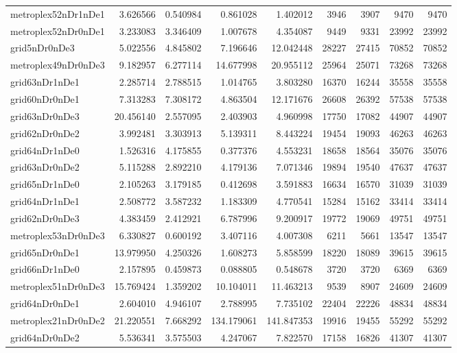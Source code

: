 \begin{longtable}{|l|r|r|r|r|r|r|r|r|}
metroplex52nDr1nDe1 & 3.626566 & 0.540984 & 0.861028 & 1.402012 & 3946 & 3907 & 9470 & 9470 \\
metroplex52nDr0nDe1 & 3.233083 & 3.346409 & 1.007678 & 4.354087 & 9449 & 9331 & 23992 & 23992 \\
grid5nDr0nDe3 & 5.022556 & 4.845802 & 7.196646 & 12.042448 & 28227 & 27415 & 70852 & 70852 \\
metroplex49nDr0nDe3 & 9.182957 & 6.277114 & 14.677998 & 20.955112 & 25964 & 25071 & 73268 & 73268 \\
grid63nDr1nDe1 & 2.285714 & 2.788515 & 1.014765 & 3.803280 & 16370 & 16244 & 35558 & 35558 \\
grid60nDr0nDe1 & 7.313283 & 7.308172 & 4.863504 & 12.171676 & 26608 & 26392 & 57538 & 57538 \\
grid63nDr0nDe3 & 20.456140 & 2.557095 & 2.403903 & 4.960998 & 17750 & 17082 & 44907 & 44907 \\
grid62nDr0nDe2 & 3.992481 & 3.303913 & 5.139311 & 8.443224 & 19454 & 19093 & 46263 & 46263 \\
grid64nDr1nDe0 & 1.526316 & 4.175855 & 0.377376 & 4.553231 & 18658 & 18564 & 35076 & 35076 \\
grid63nDr0nDe2 & 5.115288 & 2.892210 & 4.179136 & 7.071346 & 19894 & 19540 & 47637 & 47637 \\
grid65nDr1nDe0 & 2.105263 & 3.179185 & 0.412698 & 3.591883 & 16634 & 16570 & 31039 & 31039 \\
grid64nDr1nDe1 & 2.508772 & 3.587232 & 1.183309 & 4.770541 & 15284 & 15162 & 33414 & 33414 \\
grid62nDr0nDe3 & 4.383459 & 2.412921 & 6.787996 & 9.200917 & 19772 & 19069 & 49751 & 49751 \\
metroplex53nDr0nDe3 & 6.330827 & 0.600192 & 3.407116 & 4.007308 & 6211 & 5661 & 13547 & 13547 \\
grid65nDr0nDe1 & 13.979950 & 4.250326 & 1.608273 & 5.858599 & 18220 & 18089 & 39615 & 39615 \\
grid66nDr1nDe0 & 2.157895 & 0.459873 & 0.088805 & 0.548678 & 3720 & 3720 & 6369 & 6369 \\
metroplex51nDr0nDe3 & 15.769424 & 1.359202 & 10.104011 & 11.463213 & 9539 & 8907 & 24609 & 24609 \\
grid64nDr0nDe1 & 2.604010 & 4.946107 & 2.788995 & 7.735102 & 22404 & 22226 & 48834 & 48834 \\
metroplex21nDr0nDe2 & 21.220551 & 7.668292 & 134.179061 & 141.847353 & 19916 & 19455 & 55292 & 55292 \\
grid64nDr0nDe2 & 5.536341 & 3.575503 & 4.247067 & 7.822570 & 17158 & 16826 & 41307 & 41307 \\

\end{longtable}
